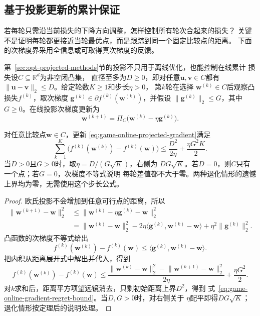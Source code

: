 \subsection{基于投影更新的累计保证}
\label{sec:game-projection-regret}

若每轮只需沿当前损失的下降方向调整，怎样控制所有轮次合起来的损失？
关键不是证明每轮都更接近当轮最优点，而是跟踪到同一个固定比较点的距离。
下面的次梯度界采用全信息或可取得真次梯度的反馈。

第~\ref{sec:opt-projected-methods}节的投影不只用于离线优化，也能控制在线累计
损失设\(C\subseteq\mathbb{R}^d\)为非空闭凸集，
直径至多为\(D\geq0\)，即对任意\(\bm{u},\bm{v}\in C\)都有
\(\lVert\bm{u}-\bm{v}\rVert_2\leq D\)。给定轮数\(K\geq1\)和步长\(\eta>0\)，
第\(k\)轮在选择
\(\bm{w}^{(k)}\in C\)后观察凸损失\(f^{(k)}\)，取次梯度
\(\bm{g}^{(k)}\in\partial f^{(k)}(\bm{w}^{(k)})\)，并假设
\(\lVert\bm{g}^{(k)}\rVert_2\leq G\)，其中\(G\geq0\)。在线投影次梯度更新为
\begin{equation}
  \bm{w}^{(k+1)}
  =
  \Pi_C\bigl(
    \bm{w}^{(k)}-\eta\bm{g}^{(k)}
  \bigr).
  \label{eq:game-online-projected-gradient}
\end{equation}

\begin{theorem}[在线投影次梯度的外部遗憾]
\label{thm:game-online-gradient-regret}
对任意比较点\(\bm{w}\in C\)，更新
\eqref{eq:game-online-projected-gradient}满足
\begin{equation}
  \sum_{k=1}^{K}
  \bigl(
    f^{(k)}(\bm{w}^{(k)})-f^{(k)}(\bm{w})
  \bigr)
  \leq
  \frac{D^2}{2\eta}
  +\frac{\eta G^2K}{2}.
  \label{eq:game-online-gradient-regret-bound}
\end{equation}
当\(D>0\)且\(G>0\)时，取\(\eta=D/(G\sqrt{K})\)，右侧为
\(DG\sqrt{K}\)。若\(D=0\)，则\(C\)只有一个点；若\(G=0\)，次梯度不等式说明
每轮差值都不大于零。两种退化情形的遗憾上界均为零，无需使用这个步长公式。
\end{theorem}

\begin{proof}
欧氏投影不会增加到任意可行点的距离，所以
\begin{align*}
  \lVert\bm{w}^{(k+1)}-\bm{w}\rVert_2^2
  &\leq
  \lVert
    \bm{w}^{(k)}-\eta\bm{g}^{(k)}-\bm{w}
  \rVert_2^2\\
  &=
  \lVert\bm{w}^{(k)}-\bm{w}\rVert_2^2
  -2\eta
  \langle
    \bm{g}^{(k)},\bm{w}^{(k)}-\bm{w}
  \rangle
  +\eta^2\lVert\bm{g}^{(k)}\rVert_2^2.
\end{align*}
凸函数的次梯度不等式给出
\[
  f^{(k)}(\bm{w}^{(k)})-f^{(k)}(\bm{w})
  \leq
  \langle
    \bm{g}^{(k)},\bm{w}^{(k)}-\bm{w}
  \rangle.
\]
把内积从距离展开式中解出并代入，得到
\[
  f^{(k)}(\bm{w}^{(k)})-f^{(k)}(\bm{w})
  \leq
  \frac{
    \lVert\bm{w}^{(k)}-\bm{w}\rVert_2^2
    -
    \lVert\bm{w}^{(k+1)}-\bm{w}\rVert_2^2
  }{2\eta}
  +\frac{\eta G^2}{2}.
\]
对\(k\)求和后，距离平方项望远镜消去，只剩初始距离上界\(D^2\)，得到
式~\eqref{eq:game-online-gradient-regret-bound}。当\(D,G>0\)时，对右侧关于
\(\eta\)配平即得\(DG\sqrt{K}\)；退化情形按定理后的说明处理。
\end{proof}

